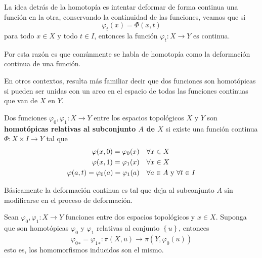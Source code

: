\documentclass[12pt]{report}
\theoremstyle{largebreak}
\newcommand\cf[3]{\ensuremath{#1:#2\rightarrow#3}}
\begin{document}
    La idea detrás de la homotopía es intentar deformar de forma continua una función en la otra, conservando la continuidad de las funciones, veamos que si
    \begin{equation*}
        \varphi_t(x)=\Phi(x,t)
    \end{equation*}
    para todo $x\in X$ y todo $t\in I$, entonces la función $\cf{\varphi_t}{X}{Y}$ es continua.

    Por esta razón es que comúnmente se habla de homotopía como la deformación continua de una función.

    \begin{obs}
        En otros contextos, resulta más familiar decir que dos funciones son homotópicas si pueden ser unidas con un arco en el espacio de todas las funciones continuas que van de $X$ en $Y$.
    \end{obs}

    \begin{mydef}
        Dos funciones $\cf{\varphi_0,\varphi_1}{X}{Y}$ entre los espacios topológicos $X$ y $Y$ son \textbf{homotópicas relativas al subconjunto $A$ de $X$} si existe una función continua $\cf{\Phi}{X\times I}{Y}$ tal que
        \begin{equation*}
            \begin{split}
                \varphi(x,0)=\varphi_0(x) & \quad\forall x\in X\\
                \varphi(x,1)=\varphi_1(x) & \quad\forall x\in X\\
                \varphi(a,t)=\varphi_0(a)=\varphi_1(a) & \quad\forall a\in A\textup{ y }\forall t\in I \\
            \end{split}
        \end{equation*}
    \end{mydef}

    Básicamente la deformación continua es tal que deja al subconjunto $A$ sin modificarse en el proceso de deformación.

    \begin{theor}
        Sean $\cf{\varphi_0,\varphi_1}{X}{Y}$ funciones entre dos espacios topológicos y $x\in X$. Suponga que son homotópicas $\varphi_0$ y $\varphi_1$ relativas al conjunto $\left\{u \right\}$, entonces
        \begin{equation*}
            \cf{{\varphi_0}_*={\varphi_1}_*}{\pi(X,u)}{\pi(Y,\varphi_0(u))}
        \end{equation*}
        esto es, los homomorfismos inducidos son el mismo.
    \end{theor}
\end{document}
